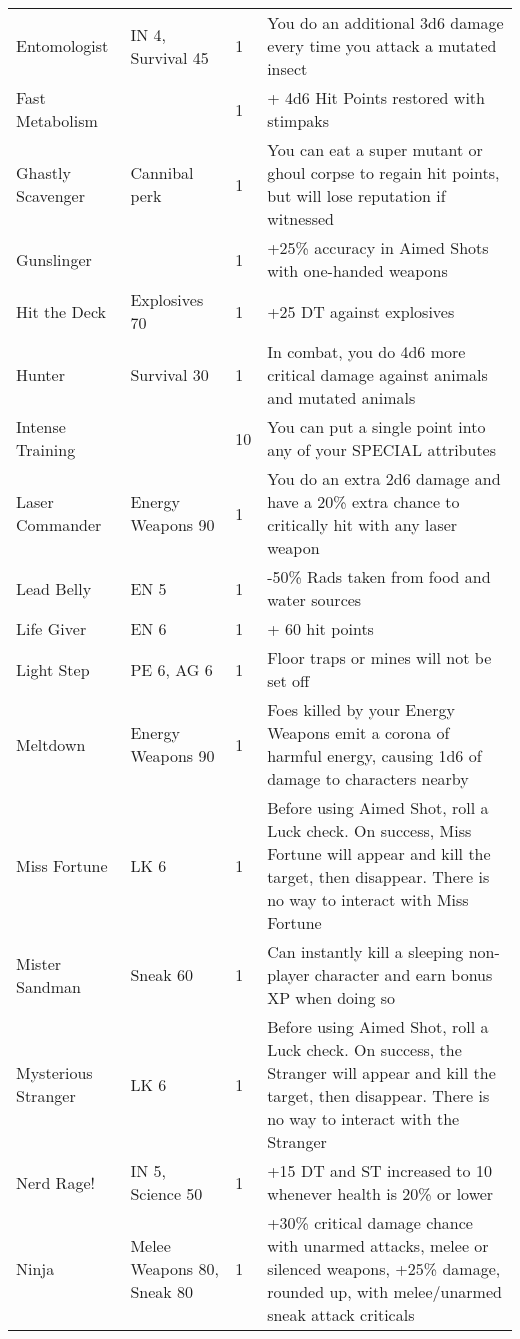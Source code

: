 \begin{longtable}{|p{3.3cm}|p{3.1cm}|p{1.2cm}|p{8.4cm}|}
Entomologist & IN 4, Survival 45 & 1 & You do an additional 3d6 damage every time you attack a mutated insect \\
Fast Metabolism & & 1 & + 4d6 Hit Points restored with stimpaks \\
Ghastly Scavenger & Cannibal perk & 1 & You can eat a super mutant or ghoul corpse to regain hit points, but will lose reputation if witnessed \\
Gunslinger & & 1 & +25\% accuracy in Aimed Shots with one-handed weapons \\
Hit the Deck & Explosives 70 & 1 & +25 DT against explosives \\
Hunter & Survival 30 & 1 & In combat, you do 4d6 more critical damage against animals and mutated animals \\
Intense Training & & 10 & You can put a single point into any of your SPECIAL attributes \\
Laser Commander & Energy Weapons 90 & 1 & You do an extra 2d6 damage and have a 20\% extra chance to critically hit with any laser weapon \\
Lead Belly & EN 5 & 1 & -50\% Rads taken from food and water sources \\
Life Giver & EN 6 & 1 & + 60 hit points \\
Light Step & PE 6, AG 6 & 1 & Floor traps or mines will not be set off \\
Meltdown & Energy Weapons 90 & 1 & Foes killed by your Energy Weapons emit a corona of harmful energy, causing 1d6 of damage to characters nearby \\
Miss Fortune & LK 6 & 1 & Before using Aimed Shot, roll a Luck check. On success, Miss Fortune will appear and kill the target, then disappear. There is no way to interact with Miss Fortune \\
Mister Sandman & Sneak 60 & 1 & Can instantly kill a sleeping non-player character and earn bonus XP when doing so \\
Mysterious Stranger & LK 6 & 1 & Before using Aimed Shot, roll a Luck check. On success, the Stranger will appear and kill the target, then disappear. There is no way to interact with the Stranger \\
Nerd Rage! & IN 5, Science 50 & 1 & +15 DT and ST increased to 10 whenever health is 20\% or lower \\
Ninja & Melee Weapons 80, Sneak 80 & 1 & +30\% critical damage chance with unarmed attacks, melee or silenced weapons, +25\% damage, rounded up, with melee/unarmed sneak attack criticals \\

\end{longtable}
